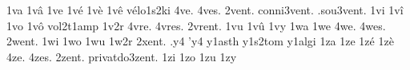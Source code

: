 {%
1va
1vâ
1ve
1vé
1vè
1vê
                    vélo1s2ki
4ve.
4ves.
     2vent.
conni3vent.
 .sou3vent.
%
1vi
1vî
1vo
1vô
                    vol2t1amp
1v2r
4vre.
4vres.
2vrent. %
1vu
1vû
1vy
1wa
1we
4we.
4wes.
2went. %
1wi
1wo
1wu
1w2r
2xent. %
.y4
'y4
                    y1asth
                    y1s2tom
                    y1algi
1za
1ze
1zé
1zè
4ze.
4zes.
        2zent.
privatdo3zent.
%
1zi
1zo
1zu
1zy
}
